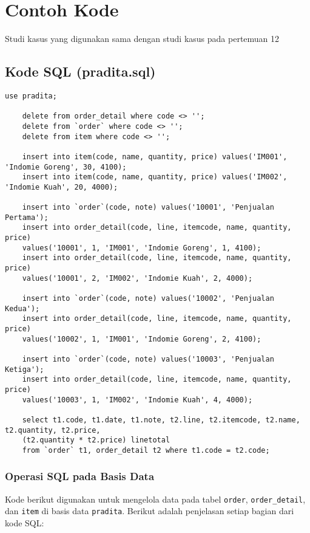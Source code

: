 \section{Contoh Kode}

Studi kasus yang digunakan sama dengan studi kasus pada pertemuan 12

\subsection{Kode SQL (pradita.sql)}

\begin{lstlisting}[style=JavaStyle]
	use pradita;
	
	delete from order_detail where code <> '';
	delete from `order` where code <> '';
	delete from item where code <> '';
	
	insert into item(code, name, quantity, price) values('IM001', 'Indomie Goreng', 30, 4100);
	insert into item(code, name, quantity, price) values('IM002', 'Indomie Kuah', 20, 4000);
	
	insert into `order`(code, note) values('10001', 'Penjualan Pertama');
	insert into order_detail(code, line, itemcode, name, quantity, price) 
	values('10001', 1, 'IM001', 'Indomie Goreng', 1, 4100);
	insert into order_detail(code, line, itemcode, name, quantity, price) 
	values('10001', 2, 'IM002', 'Indomie Kuah', 2, 4000);
	
	insert into `order`(code, note) values('10002', 'Penjualan Kedua');
	insert into order_detail(code, line, itemcode, name, quantity, price) 
	values('10002', 1, 'IM001', 'Indomie Goreng', 2, 4100);
	
	insert into `order`(code, note) values('10003', 'Penjualan Ketiga');
	insert into order_detail(code, line, itemcode, name, quantity, price) 
	values('10003', 1, 'IM002', 'Indomie Kuah', 4, 4000);
	
	select t1.code, t1.date, t1.note, t2.line, t2.itemcode, t2.name, t2.quantity, t2.price, 
	(t2.quantity * t2.price) linetotal
	from `order` t1, order_detail t2 where t1.code = t2.code;
\end{lstlisting}

\subsubsection{Operasi SQL pada Basis Data}

Kode berikut digunakan untuk mengelola data pada tabel \texttt{order}, \texttt{order\_detail}, dan \texttt{item} di basis data \texttt{pradita}. Berikut adalah penjelasan setiap bagian dari kode SQL:


